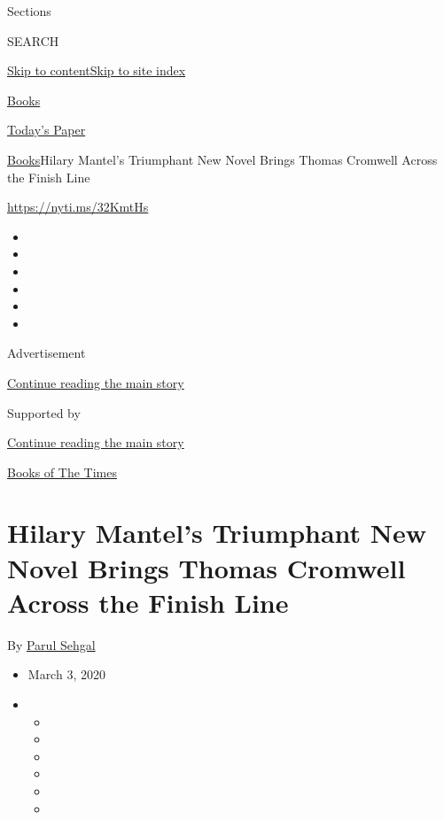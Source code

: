 Sections

SEARCH

\protect\hyperlink{site-content}{Skip to
content}\protect\hyperlink{site-index}{Skip to site index}

\href{https://www.nytimes3xbfgragh.onion/section/books}{Books}

\href{https://myaccount.nytimes3xbfgragh.onion/auth/login?response_type=cookie\&client_id=vi}{}

\href{https://www.nytimes3xbfgragh.onion/section/todayspaper}{Today's
Paper}

\href{/section/books}{Books}\textbar{}Hilary Mantel's Triumphant New
Novel Brings Thomas Cromwell Across the Finish Line

\url{https://nyti.ms/32KmtHs}

\begin{itemize}
\item
\item
\item
\item
\item
\item
\end{itemize}

Advertisement

\protect\hyperlink{after-top}{Continue reading the main story}

Supported by

\protect\hyperlink{after-sponsor}{Continue reading the main story}

\href{/column/books-of-the-times}{Books of The Times}

\hypertarget{hilary-mantels-triumphant-new-novel-brings-thomas-cromwell-across-the-finish-line}{%
\section{Hilary Mantel's Triumphant New Novel Brings Thomas Cromwell
Across the Finish
Line}\label{hilary-mantels-triumphant-new-novel-brings-thomas-cromwell-across-the-finish-line}}

By \href{https://www.nytimes3xbfgragh.onion/by/parul-sehgal}{Parul
Sehgal}

\begin{itemize}
\item
  March 3, 2020
\item
  \begin{itemize}
  \item
  \item
  \item
  \item
  \item
  \item
  \end{itemize}
\end{itemize}

